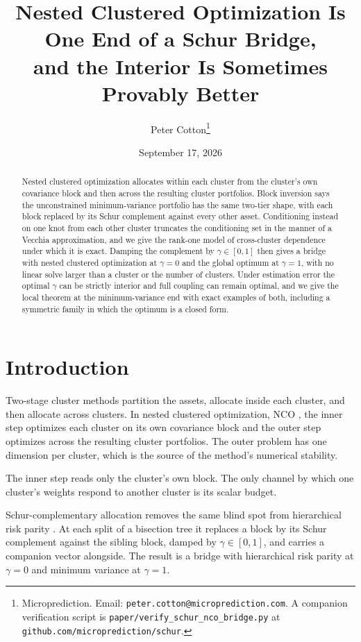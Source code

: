 \documentclass[11pt]{article}
\title{Nested Clustered Optimization Is One End of a Schur Bridge,\\
and the Interior Is Sometimes Provably Better}
\author{Peter Cotton\thanks{Microprediction.
Email: \texttt{peter.cotton@microprediction.com}. A companion
verification script is \texttt{paper/verify\_schur\_nco\_bridge.py}
at \texttt{github.com/microprediction/schur}.}}
\date{September 17, 2026}
\begin{document}
\maketitle

\begin{abstract}
Nested clustered optimization allocates within each cluster from the
cluster's own covariance block and then across the resulting cluster
portfolios. Block inversion says the unconstrained minimum-variance
portfolio has the same two-tier shape, with each block replaced by its Schur
complement against every other asset. Conditioning instead on one knot from each other cluster truncates the
conditioning set in the manner of a Vecchia approximation, and we give the rank-one model of cross-cluster dependence under which it is
exact. Damping the complement by $\gamma\in[0,1]$ then gives a bridge with
nested clustered optimization at $\gamma=0$ and the global optimum at
$\gamma=1$, with no linear solve larger than a cluster or the number of
clusters. Under estimation error the optimal $\gamma$ can be strictly
interior and full coupling can remain optimal, and we give the local
theorem at the minimum-variance end with exact examples of both, including
a symmetric family in which the optimum is a closed form.
\end{abstract}

\section{Introduction}

Two-stage cluster methods partition the assets, allocate inside each
cluster, and then allocate across clusters. In nested clustered
optimization, NCO \cite{lopezdeprado2020}, the inner step optimizes
each cluster on its own covariance block and the outer step optimizes across
the resulting cluster portfolios. The outer problem has one dimension per
cluster, which is the source of the method's numerical stability.

The inner step reads only the cluster's own block. The only channel by which
one cluster's weights respond to another cluster is its scalar budget.

Schur-complementary allocation \cite{cotton2024schur} removes the same
blind spot from hierarchical risk parity \cite{lopezdeprado2016}. At
each split of a bisection tree it replaces a block by its Schur complement
against the sibling block, damped by $\gamma\in[0,1]$, and carries a
companion vector alongside. The result is a bridge with hierarchical risk
parity at $\gamma=0$ and minimum variance at $\gamma=1$.
\end{document}
